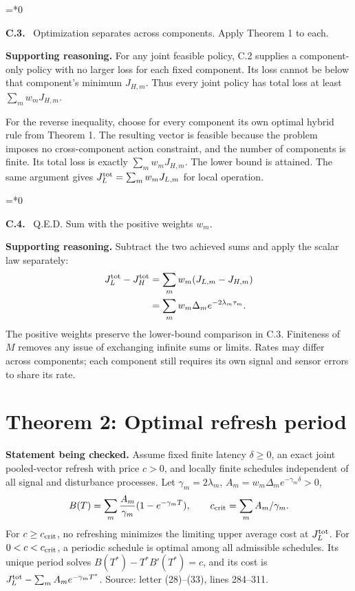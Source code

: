 \documentclass[12pt,letterpaper]{article}
\newenvironment{proofstep}[2]{%
  \begin{list}{}{\leftmargin=\dimexpr 0.17in*#2\relax%
  \setlength{\rightmargin}{0pt}\setlength{\topsep}{5pt}\setlength{\parsep}{2pt}}%
  \item[]\textbf{\textcolor{ink}{#1.}}\ }{\end{list}}
\begin{document}
\begin{proofstep}{C.3}{0}
\label{step:C.3}
Optimization separates across components. Apply Theorem 1 to each.

\textbf{Supporting reasoning.}
For any joint feasible policy, C.2 supplies a component-only policy with no larger loss for each fixed component. Its loss cannot be below that component's minimum $J_{H,m}$. Thus every joint policy has total loss at least $\sum_m w_mJ_{H,m}$.

For the reverse inequality, choose for every component its own optimal hybrid rule from Theorem 1. The resulting vector is feasible because the problem imposes no cross-component action constraint, and the number of components is finite. Its total loss is exactly $\sum_mw_mJ_{H,m}$. The lower bound is attained. The same argument gives $J_L^{\rm tot}=\sum_mw_mJ_{L,m}$ for local operation.
\par{}
\end{proofstep}

\begin{proofstep}{C.4}{0}
\label{step:C.4}
Q.E.D. Sum with the positive weights $w_m$.

\textbf{Supporting reasoning.}
Subtract the two achieved sums and apply the scalar law separately:
\begin{align*}
J_L^{\rm tot}-J_H^{\rm tot}
&=\sum_mw_m(J_{L,m}-J_{H,m})\\
&=\sum_mw_m\Delta_m e^{-2\lambda_m\tau_m}.
\end{align*}
The positive weights preserve the lower-bound comparison in C.3. Finiteness of $M$ removes any issue of exchanging infinite sums or limits. Rates may differ across components; each component still requires its own signal and sensor errors to share its rate.
\par{}
\end{proofstep}

\clearpage
\section{Theorem 2: Optimal refresh period}\label{contract-R}

\textbf{Statement being checked.}
Assume fixed finite latency $\delta\ge0$, an exact joint pooled-vector refresh with price $c>0$, and locally finite schedules independent of all signal and disturbance processes. Let $\gamma_m=2\lambda_m$, $A_m=w_m\Delta_m e^{-\gamma_m\delta}>0$,
\[
B(T)=\sum_m\frac{A_m}{\gamma_m}(1-e^{-\gamma_mT}),\qquad
c_{\rm crit}=\sum_mA_m/\gamma_m.
\]
For $c\ge c_{\rm crit}$, no refreshing minimizes the limiting upper average cost at $J_L^{\rm tot}$. For $0<c<c_{\rm crit}$, a periodic schedule is optimal among all admissible schedules. Its unique period solves $B(T^*)-T^*B'(T^*)=c$, and its cost is $J_L^{\rm tot}-\sum_m A_m e^{-\gamma_mT^*}$.
\noindent Source: letter (28)--(33), lines 284--311.
\end{document}
